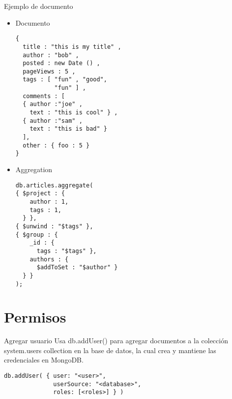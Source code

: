 \documentclass[12pt]{beamer}
\begin{document}
\begin{frame}[fragile]{Ejemplo de documento}
  \begin{multicols}{2}
    \begin{itemize}
  \item Documento
    \begin{verbatim}
{
  title : "this is my title" ,
  author : "bob" ,
  posted : new Date () ,
  pageViews : 5 ,
  tags : [ "fun" , "good", 
           "fun" ] ,
  comments : [
  { author :"joe" , 
    text : "this is cool" } ,
  { author :"sam" , 
    text : "this is bad" }
  ],
  other : { foo : 5 }
}
   \end{verbatim}

 \item Aggregation
     \begin{verbatim}
db.articles.aggregate(
{ $project : {
    author : 1,
    tags : 1,
  } },
{ $unwind : "$tags" },
{ $group : {
    _id : { 
      tags : "$tags" },
    authors : { 
      $addToSet : "$author" }
  } }
);
\end{verbatim} 
      
    \end{itemize}
  \end{multicols}
\end{frame}


\section{Permisos}
\begin{frame}[fragile]{Agregar usuario}
Usa db.addUser() para agregar documentos a la colección system.users collection en la base de datos, la cual crea y mantiene las credenciales en MongoDB.

\begin{verbatim}
db.addUser( { user: "<user>", 
              userSource: "<database>", 
              roles: [<roles>] } )
\end{verbatim}
\end{frame}
\end{document}

